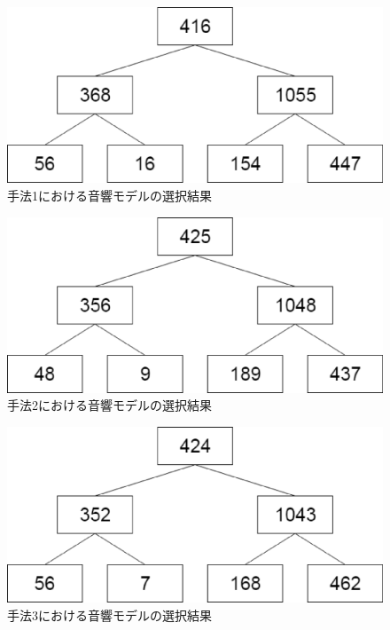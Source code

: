 \begin{figure}[H]
  \begin{center}
    \includegraphics[scale=0.5]{./figure/prob1_clustering.eps}
  \end{center}
  \caption{手法1における音響モデルの選択結果 \label{fig:prob1_clustering}}
\end{figure}

\begin{figure}[H]
  \begin{center}
    \includegraphics[scale=0.5]{./figure/prob2_clustering.eps}
  \end{center}
  \caption{手法2における音響モデルの選択結果 \label{fig:prob2_clustering}}
\end{figure}

\begin{figure}[H]
  \begin{center}
    \includegraphics[scale=0.5]{./figure/prob3_clustering.eps}
  \end{center}
  \caption{手法3における音響モデルの選択結果 \label{fig:prob3_clustering}}
\end{figure}

